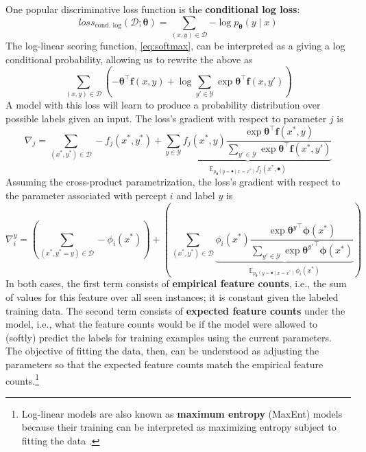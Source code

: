 \documentclass[11pt,letterpaper]{article}
\begin{document}
One popular discriminative loss function is the \textbf{conditional log loss}:
\begin{equation}\label{eq:logloss}
\textit{loss}_\text{cond. log}(\mathcal{D}; \boldsymbol{\theta}) = \sum_{(x,y)\in\mathcal{D}}{-\log{p_{\boldsymbol{\theta}}(y \mid x)}}
\end{equation}
The log-linear scoring function, \cref{eq:softmax}, can be interpreted as a giving a log conditional probability, 
allowing us to rewrite the above as 
\begin{equation}
\sum_{(x,y)\in\mathcal{D}}{\left(-\boldsymbol{\theta}^\top\mathbf{f}(x,y)+\log{\sum_{y'\in\mathcal{Y}}{\exp{\boldsymbol{\theta}^\top\mathbf{f}(x,y')}}}\right)}
\end{equation}
A model with this loss will learn to produce a probability distribution over possible labels given an input.
The loss's gradient with respect to parameter $j$ is
\begin{equation}\label{eq:loggrad}
\nabla_j = \sum_{(x^*,y^*)\in\mathcal{D}}-f_j(x^*,y^*)+\underbrace{\sum_{y\in\mathcal{Y}} f_j(x^*,y)\frac{\exp{\boldsymbol{\theta}^{\top}\mathbf{f}(x^*,y)}}{\sum_{y'\in\mathcal{Y}}{\exp{\boldsymbol{\theta}^{\top}\mathbf{f}(x^*,y')}}}}_{\mathbb{E}_{p_{\boldsymbol{\theta}}(y = \bullet \mid x=x^*)} f_j(x^*,\bullet)}
\end{equation}
Assuming the cross-product parametrization, 
the loss's gradient with respect to the parameter associated with percept $i$ and label $y$ is
\begin{equation}\label{eq:logperceptgrad}
\nabla^y_i = \left(\sum_{(x^*,y^*=y)\in\mathcal{D}}-\phi_i(x^*)\right)+\left(\sum_{(x^*,y^*)\in\mathcal{D}}{\underbrace{\phi_i(x^*)\frac{\exp{{\boldsymbol{\theta}^y}^{\top}\boldsymbol{\phi}(x^*)}}{\sum_{y'\in\mathcal{Y}}{\exp{{\boldsymbol{\theta}^{y'}}^{\top}\boldsymbol{\phi}(x^*)}}}}_{\mathbb{E}_{p_{\boldsymbol{\theta}}(y = \bullet \mid x=x^*)} \phi_i(x^*)}}\right)
\end{equation}
In both cases, the first term consists of \textbf{empirical feature counts}, 
i.e., the sum of values for this feature over all seen instances; 
it is constant given the labeled training data. The second term consists of \textbf{expected feature counts} 
under the model, i.e., what the feature counts would be if the model were allowed to (softly) predict the labels 
for training examples using the current parameters. The objective of fitting the data, then, 
can be understood as adjusting the parameters so that the expected feature counts match the empirical feature counts.\footnote{Log-linear 
models are also known as \textbf{maximum entropy} (MaxEnt) models 
because their training can be interpreted as maximizing entropy 
subject to fitting the data \citep[pp.~199--202]{smith}.}
\end{document}
